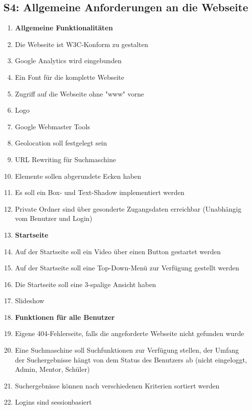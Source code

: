 \documentclass[10pt,a4paper]{scrartcl}
\begin{document}
\subsection{S4: Allgemeine Anforderungen an die Webseite}
\begin{enumerate}
\item[] \textbf{Allgemeine Funktionalitäten}
\item Die Webseite ist W3C-Konform zu gestalten
\item Google Analytics wird eingebunden
\item Ein Font für die komplette Webseite
\item Zugriff auf die Webseite ohne "www" vorne
\item Logo
\item Google Webmaster Tools
\item Geolocation soll festgelegt sein
\item URL Rewriting für Suchmaschine
\item Elemente sollen abgerundete Ecken haben
\item Es soll ein Box- und Text-Shadow implementiert werden
\item Private Ordner sind über gesonderte Zugangsdaten erreichbar (Unabhängig vom Benutzer und Login)

\item[] \textbf{Startseite}
\item Auf der Startseite soll ein Video über einen Button gestartet werden
\item Auf der Startseite soll eine Top-Down-Menü zur Verfügung gestellt werden
\item Die Startseite soll eine 3-spalige Ansicht haben
\item Slideshow

\item[] \textbf{Funktionen für alle Benutzer}
\item Eigene 404-Fehlerseite, falls die angeforderte Webseite nicht gefunden wurde
\item Eine Suchmaschine soll Suchfunktionen zur Verfügung stellen, der Umfang der Suchergebnisse hängt von dem Status des Benutzers ab (nicht eingeloggt, Admin, Mentor, Schüler)
\item Suchergebnisse können nach verschiedenen Kriterien sortiert werden
\item Logins sind sessionbasiert
\end{enumerate}



\end{document}
